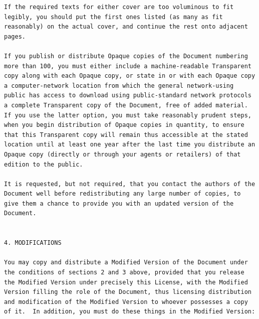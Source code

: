 \documentclass[letterpaper,10pt,english]{sphinxmanual}
\begin{document}
\begin{Verbatim}[commandchars=\\\{\}]
If the required texts for either cover are too voluminous to fit
legibly, you should put the first ones listed (as many as fit
reasonably) on the actual cover, and continue the rest onto adjacent
pages.

If you publish or distribute Opaque copies of the Document numbering
more than 100, you must either include a machine-readable Transparent
copy along with each Opaque copy, or state in or with each Opaque copy
a computer-network location from which the general network-using
public has access to download using public-standard network protocols
a complete Transparent copy of the Document, free of added material.
If you use the latter option, you must take reasonably prudent steps,
when you begin distribution of Opaque copies in quantity, to ensure
that this Transparent copy will remain thus accessible at the stated
location until at least one year after the last time you distribute an
Opaque copy (directly or through your agents or retailers) of that
edition to the public.

It is requested, but not required, that you contact the authors of the
Document well before redistributing any large number of copies, to
give them a chance to provide you with an updated version of the
Document.


4. MODIFICATIONS

You may copy and distribute a Modified Version of the Document under
the conditions of sections 2 and 3 above, provided that you release
the Modified Version under precisely this License, with the Modified
Version filling the role of the Document, thus licensing distribution
and modification of the Modified Version to whoever possesses a copy
of it.  In addition, you must do these things in the Modified Version:


\end{Verbatim}
\end{document}
